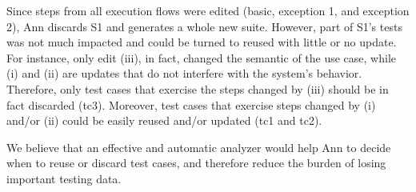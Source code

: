 Since steps from all execution flows were edited (basic, exception 1, and exception 2), Ann 
discards S1 and generates a whole new suite. However, part of S1's tests was not much impacted and could be turned to reused with little or no update. For instance, only edit (iii), in fact, changed the semantic of the use case, while (i) and (ii) are updates that do not interfere with the system's behavior. Therefore, only test cases that exercise the steps changed by (iii) should be in fact discarded (tc3). Moreover, test cases that exercise steps changed by (i) and/or (ii) could be easily reused and/or updated (tc1 and tc2). 

We believe that an effective and automatic analyzer would help Ann to decide when to reuse or discard test cases, and therefore reduce the burden of losing important testing data. 